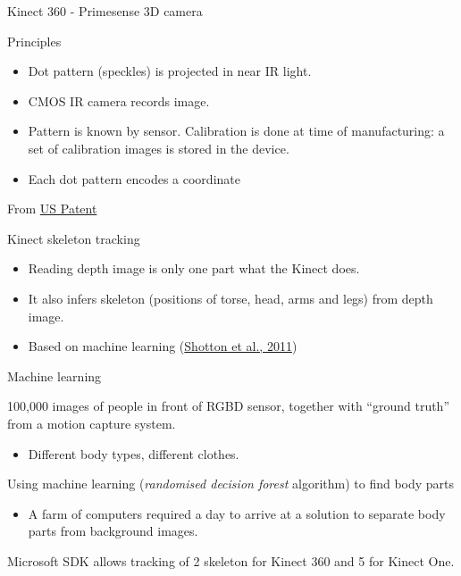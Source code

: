 \documentclass[compress]{beamer}
\providecommand{\tightlist}{%
  \setlength{\itemsep}{0pt}\setlength{\parskip}{0pt}}
\begin{document}
\begin{frame}{Kinect 360 - Primesense 3D camera}

Principles

\begin{itemize}
\tightlist
\item
  Dot pattern (speckles) is projected in near IR light.
\item
  CMOS IR camera records image.
\item
  Pattern is known by sensor. Calibration is done at time of
  manufacturing: a set of calibration images is stored in the device.
\item
  Each dot pattern encodes a coordinate
\end{itemize}

From
\href{http://worldwide.espacenet.com/publicationDetails/originalDocument?FT=D\&date=20100909\&DB=EPODOC\&locale=en_EP\&CC=US\&NR=2010225746A1\&KC=A1}{US
Patent}

\end{frame}

\begin{frame}{Kinect skeleton tracking}

\begin{itemize}
\tightlist
\item
  Reading depth image is only one part what the Kinect does.
\item
  It also infers skeleton (positions of torse, head, arms and legs) from
  depth image.
\item
  Based on machine learning
  (\href{http://research.microsoft.com/pubs/145347/BodyPartRecognition.pdf}{Shotton
  et al., 2011})
\end{itemize}

\end{frame}

\begin{frame}{Machine learning}

100,000 images of people in front of RGBD sensor, together with ``ground
truth'' from a motion capture system.

\begin{itemize}
\tightlist
\item
  Different body types, different clothes.
\end{itemize}

Using machine learning (\emph{randomised decision forest} algorithm) to
find body parts

\begin{itemize}
\tightlist
\item
  A farm of computers required a day to arrive at a solution to separate
  body parts from background images.
\end{itemize}

Microsoft SDK allows tracking of 2 skeleton for Kinect 360 and 5 for
Kinect One.

\end{frame}
\end{document}

